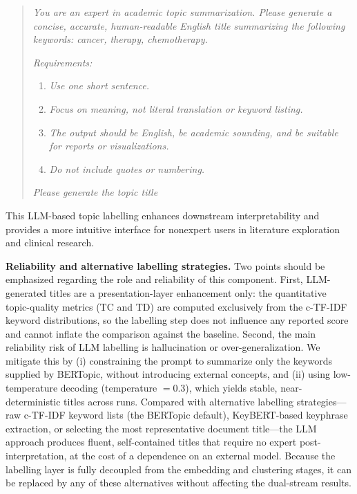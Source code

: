 \documentclass[authorproof,JACIII,researchpaper]{fujipressarticle}
\begin{document}
\begin{quote}
\textit{You are an expert in academic topic summarization. Please generate a concise, accurate, human-readable English title summarizing the following keywords: cancer, therapy, chemotherapy.}

\textit{Requirements:}
\begin{enumerate}
    \item \textit{Use one short sentence.}
    \item \textit{Focus on meaning, not literal translation or keyword listing.}
    \item \textit{The output should be English, be academic sounding, and be suitable for reports or visualizations.}
    \item \textit{Do not include quotes or numbering.}
\end{enumerate}

\textit{Please generate the topic title}
\end{quote}

This LLM-based topic labelling enhances downstream interpretability and provides a more intuitive interface for nonexpert users in literature exploration and clinical research.

\noindent\textbf{Reliability and alternative labelling strategies.}
Two points should be emphasized regarding the role and reliability of this component. First, LLM-generated titles are a presentation-layer enhancement only: the quantitative topic-quality metrics (TC and TD) are computed exclusively from the c-TF-IDF keyword distributions, so the labelling step does not influence any reported score and cannot inflate the comparison against the baseline. Second, the main reliability risk of LLM labelling is hallucination or over-generalization. We mitigate this by (i) constraining the prompt to summarize only the keywords supplied by BERTopic, without introducing external concepts, and (ii) using low-temperature decoding (temperature $=0.3$), which yields stable, near-deterministic titles across runs. Compared with alternative labelling strategies---raw c-TF-IDF keyword lists (the BERTopic default), KeyBERT-based keyphrase extraction, or selecting the most representative document title---the LLM approach produces fluent, self-contained titles that require no expert post-interpretation, at the cost of a dependence on an external model. Because the labelling layer is fully decoupled from the embedding and clustering stages, it can be replaced by any of these alternatives without affecting the dual-stream results.
\end{document}
